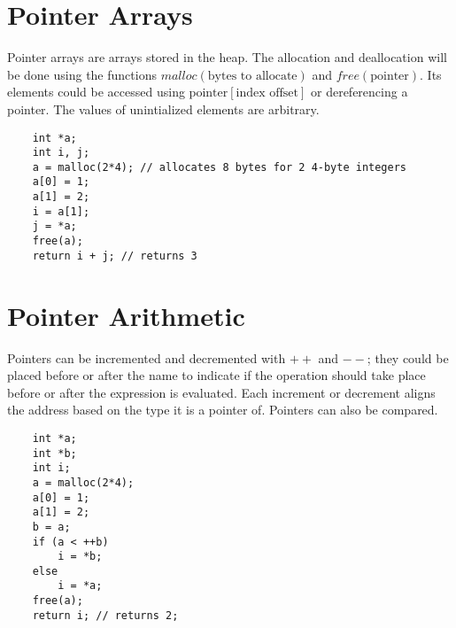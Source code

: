 \documentclass[11pt]{article}
\begin{document}
\section{Pointer Arrays}
Pointer arrays are arrays stored in the heap.
The allocation and deallocation will be done using the functions $malloc(\text{bytes to allocate})$ and $free(\text{pointer})$.
Its elements could be accessed using $\text{pointer}[\text{index offset}]$ or dereferencing a pointer.
The values of unintialized elements are arbitrary.
\begin{Verbatim}
	int *a;
	int i, j;
	a = malloc(2*4); // allocates 8 bytes for 2 4-byte integers
	a[0] = 1;
	a[1] = 2;
	i = a[1];
	j = *a;
	free(a);
	return i + j; // returns 3
\end{Verbatim}

\section{Pointer Arithmetic}
Pointers can be incremented and decremented with $++$ and $--$; they could be placed before or after the name to indicate if the operation should take place before or after the expression is evaluated.
Each increment or decrement aligns the address based on the type it is a pointer of.
Pointers can also be compared.
\begin{Verbatim}
	int *a;
	int *b;
	int i;
	a = malloc(2*4);
	a[0] = 1;
	a[1] = 2;
	b = a;
	if (a < ++b)
		i = *b;
	else
		i = *a;
	free(a);
	return i; // returns 2;
\end{Verbatim}
\end{document}
